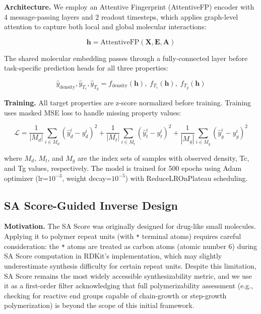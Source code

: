 \documentclass{article}
\begin{document}
\noindent\textbf{Architecture.}
We employ an Attentive Fingerprint (AttentiveFP) encoder \citep{attentivefp_2019}
with 4 message-passing layers and 2 readout timesteps, which applies graph-level
attention to capture both local and global molecular interactions:

\begin{equation}
\mathbf{h} = \text{AttentiveFP}(\mathbf{X}, \mathbf{E}, \mathbf{A})
\end{equation}

The shared molecular embedding passes through a fully-connected layer before
task-specific prediction heads for all three properties:

\begin{equation}
\hat{y}_{\text{density}}, \hat{y}_{T_c}, \hat{y}_{T_g} = 
f_{\text{density}}(\mathbf{h}),\; f_{T_c}(\mathbf{h}),\; f_{T_g}(\mathbf{h})
\end{equation}

\noindent\textbf{Training.}
All target properties are z-score normalized before training.
Training uses masked MSE loss to handle missing property values:

\begin{equation}
\mathcal{L} = \frac{1}{|M_d|}\sum_{i \in M_d}(\hat{y}^i_d - y^i_d)^2 +
              \frac{1}{|M_t|}\sum_{i \in M_t}(\hat{y}^i_t - y^i_t)^2 +
              \frac{1}{|M_g|}\sum_{i \in M_g}(\hat{y}^i_g - y^i_g)^2
\end{equation}

where $M_d$, $M_t$, and $M_g$ are the index sets of samples with observed
density, Tc, and Tg values, respectively.
The model is trained for 500 epochs using Adam optimizer
(lr=$10^{-3}$, weight decay=$10^{-5}$) with ReduceLROnPlateau scheduling.

\subsection{SA Score-Guided Inverse Design}

\noindent\textbf{Motivation.}
The SA Score \citep{ertl_sa_score_2009} was originally designed for
drug-like small molecules. Applying it to polymer repeat units (with \texttt{*}
terminal atoms) requires careful consideration: the \texttt{*} atoms are
treated as carbon atoms (atomic number 6) during SA Score computation in
RDKit's implementation, which may slightly underestimate synthesis difficulty
for certain repeat units. Despite this limitation, SA Score remains the most
widely accessible synthesizability metric, and we use it as a first-order
filter acknowledging that full polymerizability assessment (e.g., checking
for reactive end groups capable of chain-growth or step-growth polymerization)
is beyond the scope of this initial framework.
\end{document}
